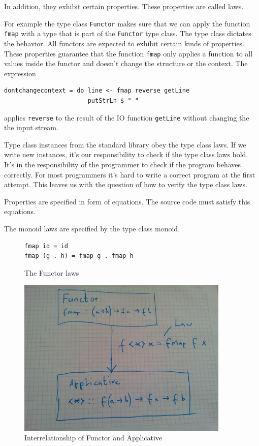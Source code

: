  In addition, they exhibit certain properties. These properties are called laws. 


For example the type class \verb|Functor| makes sure that we can apply the function \verb|fmap| with a type that is part of the \verb|Functor| type class. The type class dictates the behavior. All functors are expected to exhibit certain kinds of properties. These properties guarantee that the function \verb|fmap| only applies a function to all values inside the functor and doesn't change the structure or the context. The expression
\begin{verbatim}
dontchangecontext = do line <- fmap reverse getLine
                       putStrLn $ " "
\end{verbatim}
applies \verb|reverse| to the result of the IO function \verb|getLine| without changing the the input stream. 

Type class instances from the standard library obey the type class laws. If we write new instances, it's our responsibility to check if the type class laws hold.
It's in the responsibility of the programmer to check if the program behaves correctly. For most programmers it's hard to write a correct program at the first attempt. This leaves us with the question of how to verify the type class laws. 

Properties are specified in form of equations. The source code must satisfy this equations. 


The monoid laws are specified by the type class monoid.


\begin{figure}
  \centering
\begin{verbatim}
fmap id = id
fmap (g . h) = fmap g . fmap h
\end{verbatim}
  \caption{The Functor laws}
  \label{fig:functorlaws}
\end{figure}

\begin{figure}
  \centering
     \includegraphics[width=0.9\textwidth]{functor_applicative}
  \caption{Interrelationship of Functor and Applicative }
  \label{fig:functor_applicative}
\end{figure}
